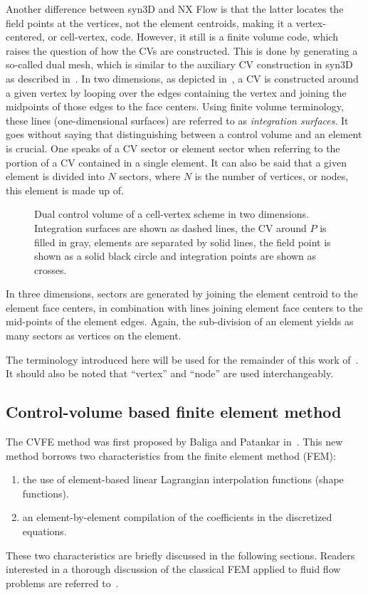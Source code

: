 Another difference between syn3D and NX Flow is that the latter locates the field points at the vertices, not the element centroids, making it a vertex-centered, or cell-vertex, code. However, it still is a finite volume code, which raises the question of how the CVs are constructed. This is done by generating a so-called dual mesh, which is similar to the auxiliary CV construction in syn3D as described in~. In two dimensions, as depicted in~, a CV is constructed around a given vertex by looping over the edges containing the vertex and joining the midpoints of those edges to the face centers. Using finite volume terminology, these lines (one-dimensional surfaces) are referred to as \textit{integration surfaces}. It goes without saying that distinguishing between a control volume and an element is crucial. One speaks of a CV sector or element sector when referring to the portion of a CV contained in a single element. It can also be said that a given element is divided into $N$ sectors, where $N$ is the number of vertices, or nodes, this element is made up of.
\begin{figure}
    \centering
    \begin{tikzpicture}[scale=3.5]
    \end{tikzpicture}
    \caption{Dual control volume of a cell-vertex scheme in two dimensions. Integration surfaces are shown as dashed lines, the CV around $P$ is filled in gray, elements are separated by solid lines, the field point is shown as a solid black circle and integration points are shown as crosses.}
    \label{fig:dualmeshtwo}
\end{figure}

In three dimensions, sectors are generated by joining the element centroid to the element face centers, in combination with lines joining element face centers to the mid-points of the element edges. Again, the sub-division of an element yields as many sectors as vertices on the element.

The terminology introduced here will be used for the remainder of this work of~. It should also be noted that ``vertex'' and ``node'' are used interchangeably.

\subsection{Control-volume based finite element method}
\label{sec:cvfem}
%
The CVFE method was first proposed by Baliga and Patankar in~\cite{baliga1980new,baliga1983control}. This new method borrows two characteristics from the finite element method (FEM):
\begin{enumerate}
    \item the use of element-based linear Lagrangian interpolation functions (shape functions).
    \item an element-by-element compilation of the coefficients in the discretized equations.
\end{enumerate}
These two characteristics are briefly discussed in the following sections. Readers interested in a thorough discussion of the classical FEM applied to fluid flow problems are referred to~\cite{reddy2000finite}.

